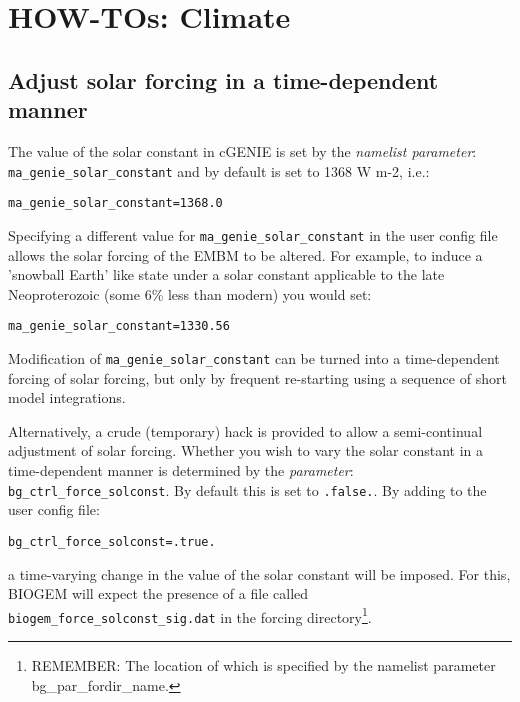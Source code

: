 \documentclass[10pt,twoside]{article}
\begin{document}
\newpage
\section{HOW-TOs: Climate}\label{how-to-3}


\subsection{Adjust solar forcing in a time-dependent manner}\label{Adjust solar forcing in a time-dependent manner}

The value of the solar constant in cGENIE is set by the \textit{namelist parameter}:
\\ \texttt{ma\_genie\_solar\_constant} and by default is set to 1368 W m-2, i.e.:
\vspace{-10pt}\begin{verbatim}ma_genie_solar_constant=1368.0\end{verbatim}\vspace{-5pt}
Specifying a different value for \texttt{ma\_genie\_solar\_constant} in the user config file allows the solar forcing of the EMBM to be altered. For example, to induce a 'snowball Earth' like state under a solar constant applicable to the late Neoproterozoic (some 6\% less than modern) you would set:
\vspace{-10pt}\begin{verbatim}ma_genie_solar_constant=1330.56\end{verbatim}\vspace{-5pt}

Modification of \texttt{ma\_genie\_solar\_constant} can be turned into a time-dependent forcing of solar forcing, but only by frequent re-starting using a sequence of short model integrations.

Alternatively, a crude (temporary) hack is provided to allow a semi-continual adjustment of solar forcing. Whether you wish to vary the solar constant in a time-dependent manner is determined by the \textit{parameter}:\\
\texttt{bg\_ctrl\_force\_solconst}. By default this is set to \texttt{.false.}. By adding to the user config file:
\vspace{-10pt}\begin{verbatim}bg_ctrl_force_solconst=.true.\end{verbatim}\vspace{-5pt}
a time-varying change in the value of the solar constant will be imposed. For this, BIOGEM will expect the presence of a file called \texttt{biogem\_force\_solconst\_sig.dat} in the forcing directory\footnote{REMEMBER: The location of which is specified by the namelist parameter bg\_par\_fordir\_name.}.
\end{document}
